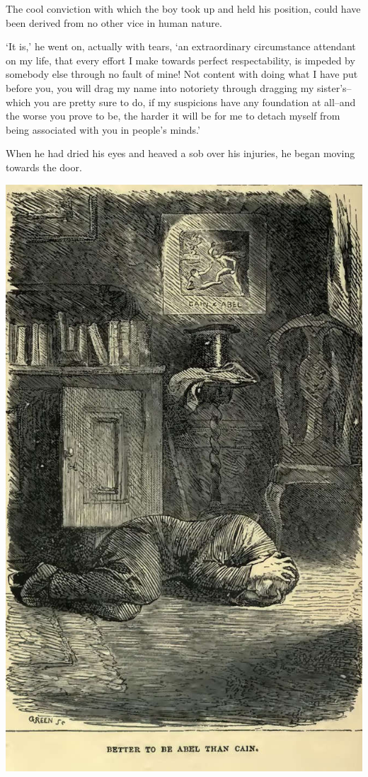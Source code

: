 The cool conviction with which the boy took up and held his position,
could have been derived from no other vice in human nature.

‘It is,’ he went on, actually with tears, ‘an extraordinary circumstance
attendant on my life, that every effort I make towards perfect
respectability, is impeded by somebody else through no fault of mine!
Not content with doing what I have put before you, you will drag my name
into notoriety through dragging my sister’s--which you are pretty sure
to do, if my suspicions have any foundation at all--and the worse you
prove to be, the harder it will be for me to detach myself from being
associated with you in people’s minds.’

When he had dried his eyes and heaved a sob over his injuries, he began
moving towards the door.

\includegraphics[scale=2.3]{04-07-01}

